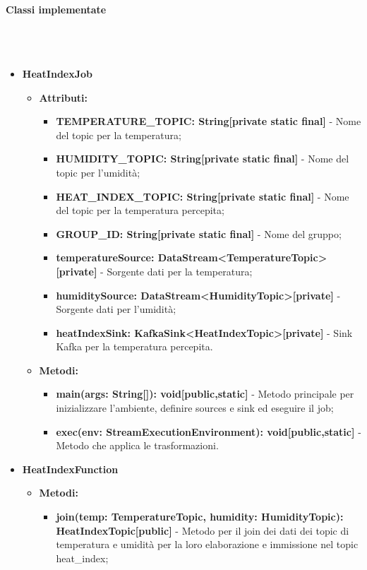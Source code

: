 \documentclass[8pt]{article}
\newcommand{\subsubsubsection}[1]{\paragraph{#1}\mbox{}\\\\}
\begin{document}
\subsubsubsection{Classi implementate}
\begin{itemize}
    \item \textbf{HeatIndexJob}
    \begin{itemize}
        \item \textbf{Attributi:}
        \begin{itemize}
            \item \textbf{TEMPERATURE\_TOPIC: String[private static final]} - Nome del topic per la temperatura;
            \item \textbf{HUMIDITY\_TOPIC: String[private static final]} - Nome del topic per l'umidità;
            \item \textbf{HEAT\_INDEX\_TOPIC: String[private static final]} - Nome del topic per la temperatura percepita;
            \item \textbf{GROUP\_ID: String[private static final]} - Nome del gruppo;
            \item \textbf{temperatureSource: DataStream<TemperatureTopic>[private]} - Sorgente dati per la temperatura;
            \item \textbf{humiditySource: DataStream<HumidityTopic>[private]} - Sorgente dati per l'umidità;
            \item \textbf{heatIndexSink: KafkaSink<HeatIndexTopic>[private]} - Sink Kafka per la temperatura percepita.
        \end{itemize}
    \end{itemize}
    \begin{itemize}
        \item \textbf{Metodi:}
        \begin{itemize}
            \item \textbf{main(args: String[]): void[public,static]} - Metodo principale per inizializzare l'ambiente, definire sources e sink ed eseguire il job;
            \item \textbf{exec(env: StreamExecutionEnvironment): void[public,static]} - Metodo che applica le trasformazioni.
        \end{itemize}
    \end{itemize}
    \item \textbf{HeatIndexFunction}
    \begin{itemize}
        \item \textbf{Metodi:}
        \begin{itemize}
            \item \textbf{join(temp: TemperatureTopic, humidity: HumidityTopic): HeatIndexTopic[public]} - Metodo per il join dei dati dei topic di temperatura e umidità per la loro elaborazione e immissione nel topic heat\_index;

\end{itemize}
\end{itemize}
\end{itemize}
\end{document}
